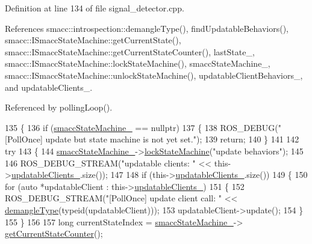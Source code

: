 Definition at line 134 of file signal\+\_\+detector.\+cpp.



References smacc\+::introspection\+::demangle\+Type(), find\+Updatable\+Behaviors(), smacc\+::\+I\+Smacc\+State\+Machine\+::get\+Current\+State(), smacc\+::\+I\+Smacc\+State\+Machine\+::get\+Current\+State\+Counter(), last\+State\+\_\+, smacc\+::\+I\+Smacc\+State\+Machine\+::lock\+State\+Machine(), smacc\+State\+Machine\+\_\+, smacc\+::\+I\+Smacc\+State\+Machine\+::unlock\+State\+Machine(), updatable\+Client\+Behaviors\+\_\+, and updatable\+Clients\+\_\+.



Referenced by polling\+Loop().


\begin{DoxyCode}
135 \{
136     \textcolor{keywordflow}{if} (\hyperlink{classsmacc_1_1SignalDetector_a46025de6ac7b5980e22144f9703236a4}{smaccStateMachine\_} == \textcolor{keyword}{nullptr})
137     \{
138         ROS\_DEBUG(\textcolor{stringliteral}{"[PollOnce] update but state machine is not yet set."});
139         \textcolor{keywordflow}{return};
140     \}
141 
142     \textcolor{keywordflow}{try}
143     \{
144         \hyperlink{classsmacc_1_1SignalDetector_a46025de6ac7b5980e22144f9703236a4}{smaccStateMachine\_}->\hyperlink{classsmacc_1_1ISmaccStateMachine_a5c8d4c9a4b11c7950266a00e48080ce3}{lockStateMachine}(\textcolor{stringliteral}{"update behaviors"});
145 
146         ROS\_DEBUG\_STREAM(\textcolor{stringliteral}{"updatable clients: "} << this->\hyperlink{classsmacc_1_1SignalDetector_a36a702afabbc335cbdb1e8699b669323}{updatableClients\_}.size());
147 
148         \textcolor{keywordflow}{if} (this->\hyperlink{classsmacc_1_1SignalDetector_a36a702afabbc335cbdb1e8699b669323}{updatableClients\_}.size())
149         \{
150             \textcolor{keywordflow}{for} (\textcolor{keyword}{auto} *updatableClient : this->\hyperlink{classsmacc_1_1SignalDetector_a36a702afabbc335cbdb1e8699b669323}{updatableClients\_})
151             \{
152                 ROS\_DEBUG\_STREAM(\textcolor{stringliteral}{"[PollOnce] update client call:  "} << 
      \hyperlink{namespacesmacc_1_1introspection_a81ad2fc77a0262640d4b1bd273938603}{demangleType}(\textcolor{keyword}{typeid}(updatableClient)));
153                 updatableClient->update();
154             \}
155         \}
156 
157         \textcolor{keywordtype}{long} currentStateIndex = \hyperlink{classsmacc_1_1SignalDetector_a46025de6ac7b5980e22144f9703236a4}{smaccStateMachine\_}->
      \hyperlink{classsmacc_1_1ISmaccStateMachine_a03966e531cefc1e096bffa46111871d2}{getCurrentStateCounter}();

\end{DoxyCode}
